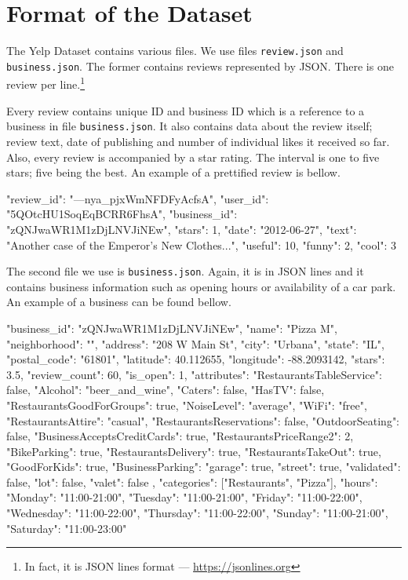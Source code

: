 \section{Format of the Dataset}\label{sec:format}

The Yelp Dataset contains various files.
We use files \texttt{review.json} and \texttt{business.json}.
The former contains reviews represented by JSON.
There is one review per line.\footnote{In fact, it is JSON lines format --- \url{https://jsonlines.org}}

Every review contains unique ID and business ID which is a reference to a business in file \texttt{business.json}.
It also contains data about the review itself; review text, date of publishing and number of individual likes it received so far.
Also, every review is accompanied by a star rating.
The interval is one to five stars; five being the best.
An example of a prettified review is bellow.

\begin{code}
{
	"review_id": "---nya_pjxWmNFDFyAcfsA",
	"user_id": "5QOtcHU1SoqEqBCRR6FhsA",
	"business_id": "zQNJwaWR1M1zDjLNVJiNEw",
	"stars": 1,
	"date": "2012-06-27",
	"text": "Another case of the Emperor's New Clothes...",
	"useful": 10,
	"funny": 2,
	"cool": 3
}
\end{code}

The second file we use is \texttt{business.json}.
Again, it is in JSON lines and it contains business information such as opening hours or availability of a car park.
An example of a business can be found bellow.

\begin{code}
{
	"business_id": "zQNJwaWR1M1zDjLNVJiNEw",
	"name": "Pizza M",
	"neighborhood": "",
	"address": "208 W Main St",
	"city": "Urbana",
	"state": "IL",
	"postal_code": "61801",
	"latitude": 40.112655,
	"longitude": -88.2093142,
	"stars": 3.5,
	"review_count": 60,
	"is_open": 1,
	"attributes": {
		"RestaurantsTableService": false,
		"Alcohol": "beer_and_wine",
		"Caters": false,
		"HasTV": false,
		"RestaurantsGoodForGroups": true,
		"NoiseLevel": "average",
		"WiFi": "free",
		"RestaurantsAttire": "casual",
		"RestaurantsReservations": false,
		"OutdoorSeating": false,
		"BusinessAcceptsCreditCards": true,
		"RestaurantsPriceRange2": 2,
		"BikeParking": true,
		"RestaurantsDelivery": true,
		"RestaurantsTakeOut": true,
		"GoodForKids": true,
		"BusinessParking": {
			"garage": true,
			"street": true,
			"validated": false,
			"lot": false,
			"valet": false
		}
	},
	"categories": ["Restaurants", "Pizza"],
	"hours": {
		"Monday": "11:00-21:00",
		"Tuesday": "11:00-21:00",
		"Friday": "11:00-22:00",
		"Wednesday": "11:00-22:00",
		"Thursday": "11:00-22:00",
		"Sunday": "11:00-21:00",
		"Saturday": "11:00-23:00"
	}
}
\end{code}

